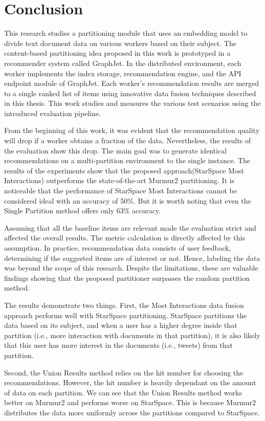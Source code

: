 \chapter{Conclusion}

This research studies a partitioning module that uses an embedding model to divide text document data on various workers based on their subject. The content-based partitioning idea proposed in this work is prototyped in a recommender system called GraphJet. In the distributed environment, each worker implements the index storage, recommendation engine, and the API endpoint module of GraphJet. Each worker's recommendation results are merged to a single ranked list of items using innovative data fusion techniques described in this thesis. This work studies and measures the various test scenarios using the introduced evaluation pipeline.


From the beginning of this work, it was evident that the recommendation quality will drop if a worker obtains a fraction of the data. Nevertheless, the results of the evaluation show this drop. The main goal was to generate identical recommendations on a multi-partition environment to the single instance. The results of the experiments show that the proposed approach(StarSpace Most Interactions) outperforms the state-of-the-art Murmur2 partitioning. It is noticeable that the performance of StarSpace Most Interactions cannot be considered ideal with an accuracy of 50\%. But it is worth noting that even the Single Partition method offers only 63\% accuracy.


Assuming that all the baseline items are relevant made the evaluation strict and affected the overall results. The metric calculation is directly affected by this assumption. In practice, recommendation data consists of user feedback, determining if the suggested items are of interest or not. Hence, labeling the data was beyond the scope of this research. Despite the limitations, these are valuable findings showing that the proposed partitioner surpasses the random partition method.


The results demonstrate two things. First, the Most Interactions data fusion approach performs well with StarSpace partitioning. StarSpace partitions the data based on its subject, and when a user has a higher degree inside that partition (i.e., more interaction with documents in that partition), it is also likely that this user has more interest in the documents (i.e., tweets) from that partition. 

Second, the Union Results method relies on the hit number for choosing the recommendations. However, the hit number is heavily dependant on the amount of data on each partition. We can see that the Union Results method works better on Murmur2 and performs worse on StarSpace. This is because Murmur2 distributes the data more uniformly across the partitions compared to StarSpace.



